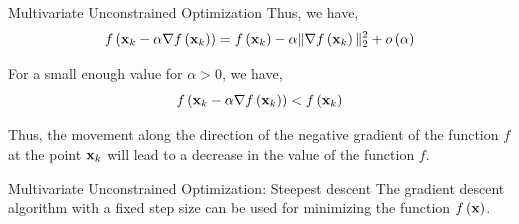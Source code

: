 \documentclass[aspectratio=169]{beamer}
\def\mf{\ensuremath\mathbf}
\def\lp{\ensuremath\left(}
\def\rp{\ensuremath\right)}
\newcommand{\ct}[1]{\lp #1\rp}
\begin{document}
\begin{frame} {Multivariate Unconstrained Optimization}
  Thus, we have,
  \[ f\ct{\mf{x}_k - \alpha \nabla f\ct{\mf{x}_k}} =  f\ct{\mf{x}_k} - \alpha \Vert \nabla f\ct{\mf{x}_k} \Vert_2^2 + o\ct{\alpha} \]

  For a small enough value for $\alpha > 0$, we have,
  \[ f\ct{\mf{x}_k - \alpha \nabla f\ct{\mf{x}_k}} < f\ct{\mf{x}_k} \]

  Thus, the movement along the direction of the negative gradient of the function $f$ at the point $\mf{x}_k$ will lead to a decrease in the value of the function $f$.
\end{frame}


\begin{frame} {Multivariate Unconstrained Optimization: Steepest descent}
  The gradient descent algorithm with a fixed step size can be used for minimizing the function $f\ct{\mf{x}}$.
\end{frame}
\end{document}
